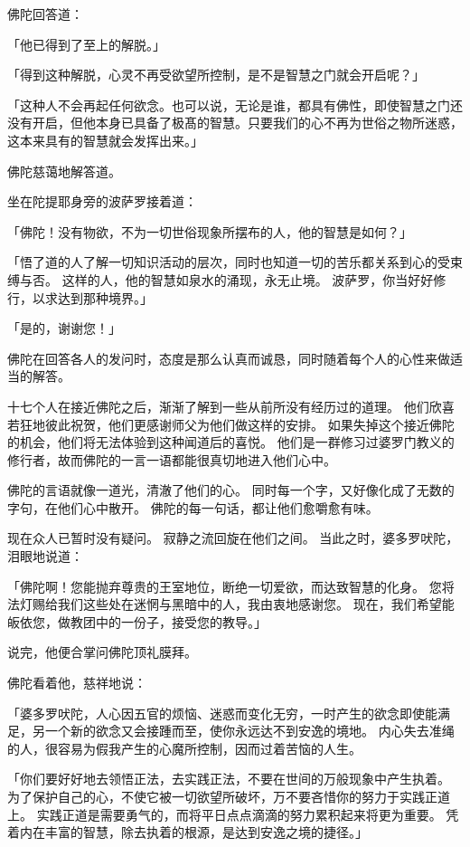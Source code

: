 \documentclass[twoside,openany]{book}
\begin{document}
佛陀回答道：

「他已得到了至上的解脱。」

「得到这种解脱，心灵不再受欲望所控制，是不是智慧之门就会开启呢？」

「这种人不会再起任何欲念。也可以说，无论是谁，都具有佛性，即使智慧之门还没有开启，但他本身已具备了极髙的智慧。只要我们的心不再为世俗之物所迷惑，这本来具有的智慧就会发挥出来。」

佛陀慈蔼地解答道。

坐在陀提耶身旁的波萨罗接着道：

「佛陀！没有物欲，不为一切世俗现象所摆布的人，他的智慧是如何？」

「悟了道的人了解一切知识活动的层次，同时也知道一切的苦乐都关系到心的受束缚与否。
这样的人，他的智慧如泉水的涌现，永无止境。
波萨罗，你当好好修行，以求达到那种境界。」

「是的，谢谢您！」

佛陀在回答各人的发问时，态度是那么认真而诚恳，同时随着每个人的心性来做适当的解答。

十七个人在接近佛陀之后，渐渐了解到一些从前所没有经历过的道理。
他们欣喜若狂地彼此祝贺，他们更感谢师父为他们做这样的安排。
如果失掉这个接近佛陀的机会，他们将无法体验到这种闻道后的喜悦。
他们是一群修习过婆罗门教义的修行者，故而佛陀的一言一语都能很真切地进入他们心中。

佛陀的言语就像一道光，清澈了他们的心。
同时每一个字，又好像化成了无数的字句，在他们心中散开。
佛陀的每一句话，都让他们愈嚼愈有味。

现在众人已暂时没有疑问。
寂静之流回旋在他们之间。
当此之时，婆多罗吠陀，泪眼地说道：

「佛陀啊！您能抛弃尊贵的王室地位，断绝一切爱欲，而达致智慧的化身。
您将法灯赐给我们这些处在迷惘与黑暗中的人，我由衷地感谢您。
现在，我们希望能皈依您，做教团中的一份子，接受您的教导。」

说完，他便合掌问佛陀顶礼膜拜。

佛陀看着他，慈祥地说：

「婆多罗吠陀，人心因五官的烦恼、迷惑而变化无穷，一时产生的欲念即使能满足，另一个新的欲念又会接踵而至，使你永远达不到安逸的境地。
内心失去准绳的人，很容易为假我产生的心魔所控制，因而过着苦恼的人生。

「你们要好好地去领悟正法，去实践正法，不要在世间的万般现象中产生执着。
为了保护自己的心，不使它被一切欲望所破坏，万不要吝惜你的努力于实践正道上。
实践正道是需要勇气的，而将平日点点滴滴的努力累积起来将更为重要。
凭着内在丰富的智慧，除去执着的根源，是达到安逸之境的捷径。」
\end{document}
